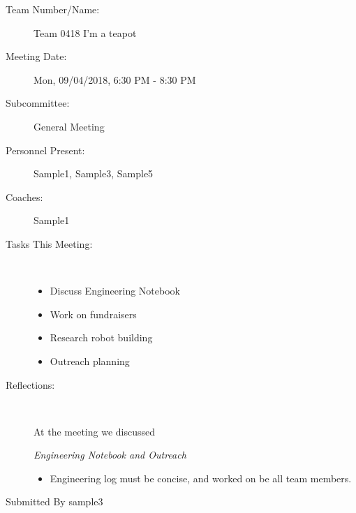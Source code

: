 \begin{description}
	\item[Team Number/Name:] Team 0418 I'm a teapot 
	\item[Meeting Date:] Mon, 09/04/2018, 6:30 PM - 8:30 PM
	\item[Subcommittee:] General Meeting
	
	\item[Personnel Present:] 
	Sample1, 
	Sample3, 
	Sample5
	\item[Coaches:] 
	Sample1
	
	
	\item[Tasks This Meeting:] \
	\begin{itemize}
		\item Discuss Engineering Notebook
		\item Work on fundraisers
		\item Research robot building
		\item Outreach planning
	\end{itemize}
	\item[Reflections:] \
	
	At the meeting we discussed 
	
	\textit{Engineering Notebook and Outreach} 
	\begin{itemize}  
		\item Engineering log must be concise, and worked on be all team members.
	\end{itemize}
	
	
	\item [Submitted By sample3]\
\end{description}